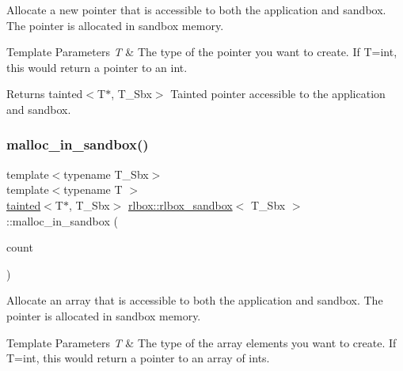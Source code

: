 Allocate a new pointer that is accessible to both the application and sandbox. The pointer is allocated in sandbox memory. 


\begin{DoxyTemplParams}{Template Parameters}
{\em T} & The type of the pointer you want to create. If T=int, this would return a pointer to an int.\\
\hline
\end{DoxyTemplParams}
\begin{DoxyReturn}{Returns}
tainted$<$\+T$\ast$, T\+\_\+\+Sbx$>$ Tainted pointer accessible to the application and sandbox. 
\end{DoxyReturn}
\mbox{\label{classrlbox_1_1rlbox__sandbox_a967ee4efa3c49a4493eaeda65b338e70}} 
\subsubsection{\texorpdfstring{malloc\+\_\+in\+\_\+sandbox()}{malloc\_in\_sandbox()}\hspace{0.1cm}{\footnotesize\ttfamily [2/2]}}
{\footnotesize\ttfamily template$<$typename T\+\_\+\+Sbx$>$ \\
template$<$typename T $>$ \\
\hyperlink{classrlbox_1_1tainted}{tainted}$<$T$\ast$, T\+\_\+\+Sbx$>$ \hyperlink{classrlbox_1_1rlbox__sandbox}{rlbox\+::rlbox\+\_\+sandbox}$<$ T\+\_\+\+Sbx $>$\+::malloc\+\_\+in\+\_\+sandbox (\begin{DoxyParamCaption}\item[{uint32\+\_\+t}]{count }\end{DoxyParamCaption})\hspace{0.3cm}{\ttfamily [inline]}}



Allocate an array that is accessible to both the application and sandbox. The pointer is allocated in sandbox memory. 


\begin{DoxyTemplParams}{Template Parameters}
{\em T} & The type of the array elements you want to create. If T=int, this would return a pointer to an array of ints.\\
\hline
\end{DoxyTemplParams}

